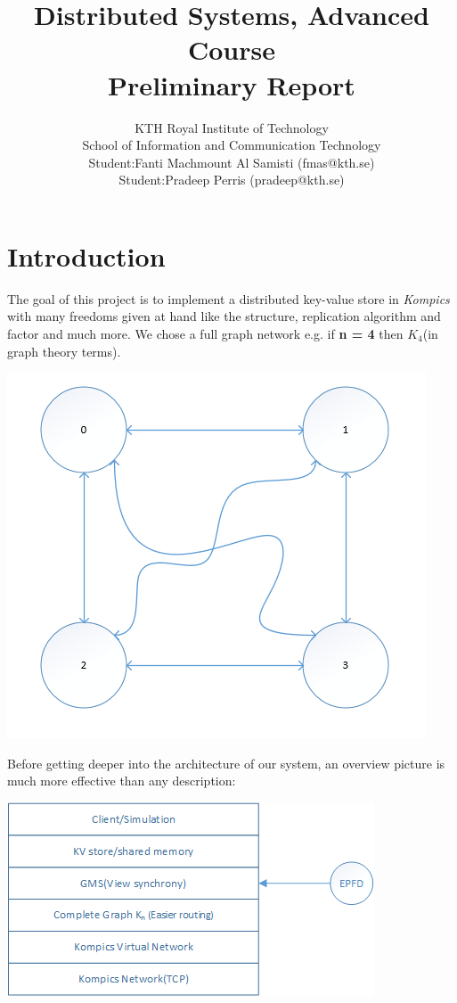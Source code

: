 \documentclass[a4paper, 11pt]{article}
\title{\textbf{Distributed Systems, Advanced Course \\ Preliminary Report}}
\author{KTH Royal Institute of Technology \\ 
		School of Information and Communication Technology \\
		Student:Fanti Machmount Al Samisti (fmas@kth.se) \\
		Student:Pradeep Perris (pradeep@kth.se)}
\begin{document}
	
\maketitle

\tableofcontents

\clearpage

\section{Introduction}

\noindent The goal of this project is to implement a distributed key-value store in \textit{Kompics}\cite{kompics} with many freedoms given at hand like the structure, replication algorithm and factor and much more. We chose a full graph network e.g. if \textbf{n = 4} then $K_4$(in graph theory terms).

{\centering\includegraphics[scale = 0.9]{./figures/network-overview.png}\par}

\noindent Before getting deeper into the architecture of our system, an overview picture is much more effective than any description:

{\centering\includegraphics[scale = 0.9]{./figures/architecture.png}\par}
\end{document}
